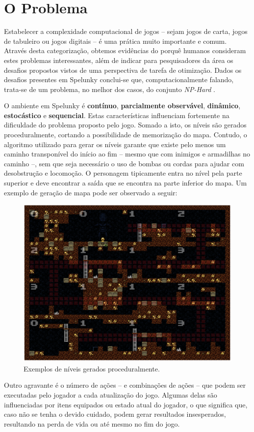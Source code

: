 \chapter{\label{chap:problem}O Problema}
Estabelecer a complexidade computacional de jogos -- sejam jogos de carta,
jogos de tabuleiro ou jogos digitais -- é uma prática muito importante e comum.
Através desta categorização, obtemos evidências do porquê humanos consideram
estes problemas interessantes, além de indicar para pesquisadores da área os
desafios propostos vistos de uma perspectiva de tarefa de otimização.  Dados os
desafios presentes em Spelunky conclui-se que, computacionalmente falando,
trata-se de um problema, no melhor dos casos, do conjunto \textit{NP-Hard}
\cite{SPELUNKYHARD}.

O ambiente em Spelunky é \textbf{contínuo}, \textbf{parcialmente observável},
\textbf{dinâmico}, \textbf{estocástico} e \textbf{sequencial}. Estas
características influenciam fortemente na dificuldade do problema proposto pelo
jogo. Somado a isto, os níveis são gerados proceduralmente, cortando a
possibilidade de memorização do mapa. Contudo, o algoritmo utilizado para gerar
os níveis garante que existe pelo menos um caminho transponível do início ao fim
-- mesmo que com inimigos e armadilhas no caminho --, sem que seja necessário o
uso de bombas ou cordas para ajudar com desobstrução e locomoção. O personagem
tipicamente entra no nível pela parte superior e deve encontrar a saída que se
encontra na parte inferior do mapa. Um exemplo de geração de mapa pode ser
observado a seguir:

\begin{figure}[htb!]
\centering\includegraphics[width=.65\textwidth]{fig/spelunky-level-example.png}
\caption {\label{fig:spelunky-level-example}Exemplos de níveis gerados
proceduralmente.} \end{figure}

Outro agravante é o número de ações -- e combinações de ações -- que podem ser
executadas pelo jogador a cada atualização do jogo. Algumas delas são
influenciadas por itens equipados ou estado atual do jogador, o que significa
que, caso não se tenha o devido cuidado, podem gerar resultados insesperados,
resultando na perda de vida ou até mesmo no fim do jogo.

